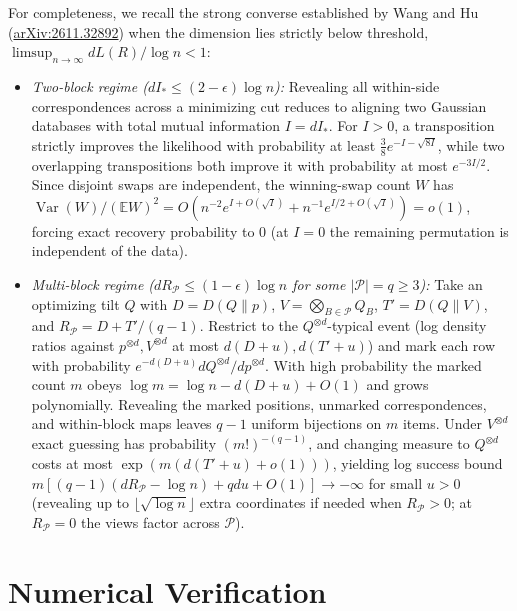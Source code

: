 \documentclass[11pt]{article}
\theoremstyle{plain}
\theoremstyle{definition}
\theoremstyle{remark}
\DeclareMathOperator{\Var}{Var}
\begin{document}
For completeness, we recall the strong converse established by Wang and Hu (\href{https://arxiv.org/abs/2611.32892}{arXiv:2611.32892}) when the dimension lies strictly below threshold, $\limsup_{n \to \infty} d L(R)/\log n < 1$:
\begin{itemize}[leftmargin=2em,itemsep=2pt]
\item \emph{Two-block regime ($d I_* \le (2 - \epsilon)\log n$):} Revealing all within-side correspondences across a minimizing cut reduces to aligning two Gaussian databases with total mutual information $I = d I_*$. For $I > 0$, a transposition strictly improves the likelihood with probability at least $\frac{3}{8}e^{-I-\sqrt{8I}}$, while two overlapping transpositions both improve it with probability at most $e^{-3I/2}$. Since disjoint swaps are independent, the winning-swap count $W$ has $\Var(W)/(\mathbb{E}W)^2 = O(n^{-2}e^{I+O(\sqrt{I})} + n^{-1}e^{I/2+O(\sqrt{I})}) = o(1)$, forcing exact recovery probability to $0$ (at $I = 0$ the remaining permutation is independent of the data).
\item \emph{Multi-block regime ($d R_{\mathcal{P}} \le (1 - \epsilon)\log n$ for some $|\mathcal{P}| = q \ge 3$):} Take an optimizing tilt $Q$ with $D = D(Q\|p)$, $V = \bigotimes_{B \in \mathcal{P}} Q_B$, $T' = D(Q\|V)$, and $R_{\mathcal{P}} = D + T'/(q-1)$. Restrict to the $Q^{\otimes d}$-typical event (log density ratios against $p^{\otimes d}, V^{\otimes d}$ at most $d(D+u), d(T'+u)$) and mark each row with probability $e^{-d(D+u)} dQ^{\otimes d}/dp^{\otimes d}$. With high probability the marked count $m$ obeys $\log m = \log n - d(D+u) + O(1)$ and grows polynomially. Revealing the marked positions, unmarked correspondences, and within-block maps leaves $q - 1$ uniform bijections on $m$ items. Under $V^{\otimes d}$ exact guessing has probability $(m!)^{-(q-1)}$, and changing measure to $Q^{\otimes d}$ costs at most $\exp(m(d(T'+u)+o(1)))$, yielding log success bound $m[(q-1)(dR_{\mathcal{P}} - \log n) + qdu + O(1)] \to -\infty$ for small $u > 0$ (revealing up to $\lfloor\sqrt{\log n}\rfloor$ extra coordinates if needed when $R_{\mathcal{P}} > 0$; at $R_{\mathcal{P}} = 0$ the views factor across $\mathcal{P}$).
\end{itemize}

\section{Numerical Verification}
\end{document}

